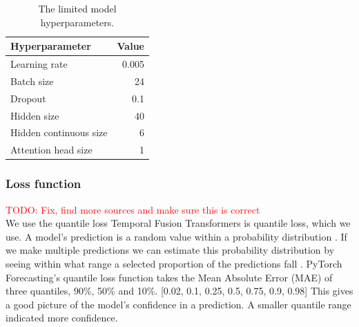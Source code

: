         \begin{table}[ht!]
        \begin{center}
        \caption{The limited model hyperparameters.
        \label{tab:lim_params}}
        \vspace{0.5cm}
        \begin{tabular}{|l|r|}
        \hline
        \textbf{Hyperparameter} & \textbf{Value} \\ \hline
        Learning rate            & 0.005         \\ \hline
        Batch size              & 24            \\ \hline
        Dropout                 & 0.1            \\ \hline
        Hidden size            & 40         \\ \hline
        Hidden continuous size & 6         \\ \hline
        Attention head size    & 1         \\ \hline
        \end{tabular}
        
        \end{center}
        \end{table}
    
    \subsubsection{Loss function}\label{sec:loss_function}
    \textcolor{red}{TODO: Fix, find more sources and make sure this is correct}\\
    We use the quantile loss  Temporal Fusion Transformers is quantile loss, which we use.
    A model's prediction is a random value within a probability distribution \cite{}. If we make multiple predictions we can estimate this probability distribution by seeing within what range a selected proportion of the predictions fall \cite{koenker_quantile_2001}. PyTorch Forecasting's quantile loss function takes the Mean Absolute Error (MAE) of three quantiles, 90\%, 50\% and 10\%. [0.02, 0.1, 0.25, 0.5, 0.75, 0.9, 0.98] This gives a good picture of the model's confidence in a prediction. A smaller quantile range indicated more confidence.
    